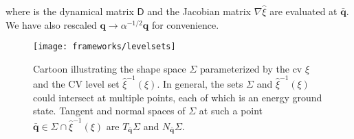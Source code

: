%
where is the dynamical matrix $\mathsf{D}$ and the Jacobian matrix $\nabla\hat{\xi}$ are evaluated at $\bar{\bm{q}}$.
We have also rescaled $\bm{q} \to \alpha^{-1/2}\bm{q}$ for convenience.
%
\begin{figure}
  \begin{center}
    \texttt{[image: frameworks/levelsets]}
  \end{center}
  \caption{Cartoon illustrating the shape space $\Sigma$ parameterized by the \ac{cv} $\xi$ and the CV level set $\hat{\xi}^{-1}(\xi)$.
    In general, the sets $\Sigma$ and $\hat{\xi}^{-1}(\xi)$ could intersect at multiple points, each of which is an energy ground state.
    Tangent and normal spaces of $\Sigma$ at such a point $\bar{\bm{q}} \in \Sigma \cap \hat{\xi}^{-1}(\xi)$ are $T_{\bar{\bm{q}}}\Sigma$ and $N_{\bar{\bm{q}}}\Sigma$.}
  \label{fig:levelsets}
\end{figure}

